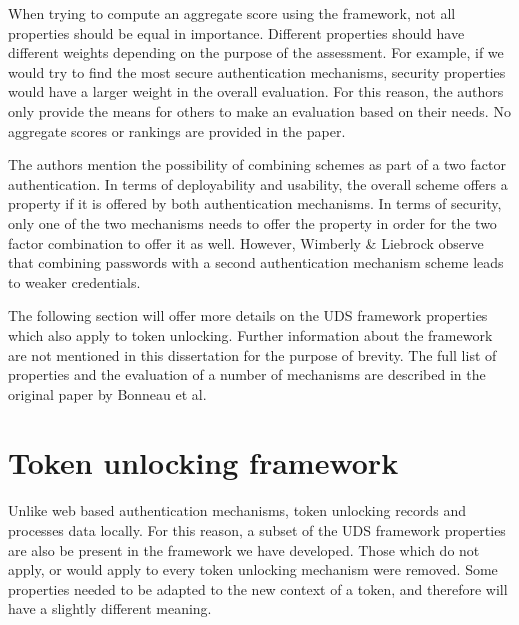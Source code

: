 When trying to compute an aggregate score using the framework, not all properties should be equal in importance. Different properties should have different weights depending on the purpose of the assessment. For example, if we would try to find the most secure authentication mechanisms, security properties would have a larger weight in the overall evaluation. For this reason, the authors only provide the means for others to make an evaluation based on their needs. No aggregate scores or rankings are provided in the paper. 

The authors mention the possibility of combining schemes as part of a two factor authentication. In terms of deployability and usability, the overall scheme offers a property if it is offered by both authentication mechanisms. In terms of security, only one of the two mechanisms needs to offer the property in order for the two factor combination to offer it as well. However, Wimberly \& Liebrock \cite{wimberly2011using} observe that combining passwords with a second authentication mechanism scheme leads to weaker credentials.

The following section will offer more details on the UDS framework properties which also apply to token unlocking. Further information about the framework are not mentioned in this dissertation for the purpose of brevity.  The full list of properties and the evaluation of a number of mechanisms are described in the original paper by Bonneau et al. 

\section{Token unlocking framework}
Unlike web based authentication mechanisms, token unlocking records and processes data locally. For this reason, a subset of the UDS framework properties are also be present in the framework we have developed. Those which do not apply, or would apply to every token unlocking mechanism were removed. Some properties needed to be adapted to the new context of a token, and therefore will have a slightly different meaning.

